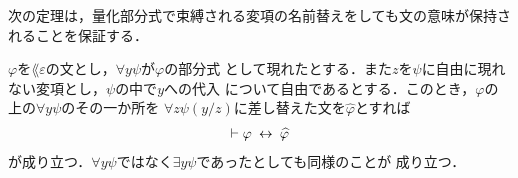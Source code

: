 	次の定理は，量化部分式で束縛される変項の名前替えをしても文の意味が保持されることを保証する．
	\begin{screen}
		\begin{logicalthm}[量化部分式を差し替えても同値]
		\label{logicalthm:equivalence_by_replacing_bound_variables}
			$\varphi$を$\lang{\varepsilon}$の文とし，$\forall y \psi$が$\varphi$の部分式
			として現れたとする．また$z$を$\psi$に自由に現れない変項とし，$\psi$の中で$y$への代入
			について自由であるとする．このとき，$\varphi$の上の$\forall y \psi$のその一か所を
			$\forall z \psi(y/z)$に差し替えた文を$\widehat{\varphi}$とすれば
			\begin{align}
				\vdash \varphi \hspace{0.25em}\leftrightarrow\hspace{0.25em} \widehat{\varphi}
			\end{align}
			が成り立つ．$\forall y \psi$ではなく$\exists y \psi$であったとしても同様のことが
			成り立つ．
		\end{logicalthm}
	\end{screen}
	

